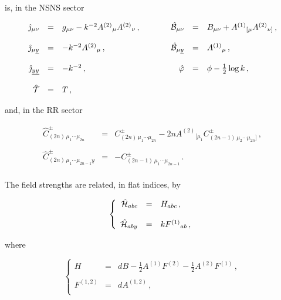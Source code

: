 \documentclass[12pt,a4paper]{article}
\begin{document}
\noindent is, in the NSNS sector

\begin{equation}
\begin{array}{rclrcl}
\hat{\jmath}_{\mu\nu} & = & 
g_{\mu\nu}-k^{-2}A^{(2)}{}_{\mu}A^{(2)}{}_{\nu}\, ,
\hspace{1cm}&
\hat{\cal B}_{\mu\nu} & = & 
B_{\mu\nu}+A^{(1)}{}_{[\mu}A^{(2)}{}_{\nu]}\, ,
\\
& & & & &
\\
\hat{\jmath}_{\mu\underline{y}} & = & -k^{-2}A^{(2)}{}_{\mu}\, , &
\hat{\cal B}_{\mu\underline{y}} & = & A^{(1)}{}_{\mu}\, ,
\\
& & & & &
\\
\hat{\jmath}_{\underline{yy}} & = & -k^{-2}\, , &
\hat{\varphi}               & = & \phi -\frac{1}{2}\log{k}\, ,
\\
& & & & & 
\\
\hat{\cal T} & = & T\, ,& & & \\
\end{array}
\label{eq:9dNSNS0B}
\end{equation}

\noindent and, in the RR sector

\begin{equation}
\begin{array}{lcl}
\hat{C}^{\pm}_{(2n)\, \mu_{1}\cdots\mu_{2n}} & = & 
C^{\pm}_{(2n)\, \mu_{1}\cdots\mu_{2n}}
-2nA^{(2)}{}_{[\mu_{1}} C^{\pm}_{(2n-1)\, \mu_{2}\cdots\mu_{2n}]}\, ,\\
& & \\
\hat{C}^{\pm}_{(2n)\, \mu_{1}\cdots\mu_{2n-1}\underline{y}} & = & 
-C^{\pm}_{(2n-1)\, \mu_{1}\cdots\mu_{2n-1}}\, .\\ 
\end{array}
\label{eq:9dRR0B-1}
\end{equation}

The field strengths are related, in flat indices, by

\begin{equation}
\left\{
\begin{array}{rcl}
\hat{\cal H}_{abc} & = & H_{abc}\, ,\\
& & \\
\hat{\cal H}_{aby} & = & k F^{(1)}{}_{ab}\, ,\\
\end{array}
\right.
\end{equation}

\noindent where

\begin{equation}
\label{eq:d9NSNSfieldstrengths}
\left\{
\begin{array}{rcl}
H & = & dB  -\frac{1}{2}A^{(1)}F^{(2)}
-\frac{1}{2}A^{(2)}F^{(1)}\, ,\\
& & \\
F^{(1,2)} & = & d A^{(1,2)}\, ,\\
\end{array}
\right.
\end{equation}
\end{document}
